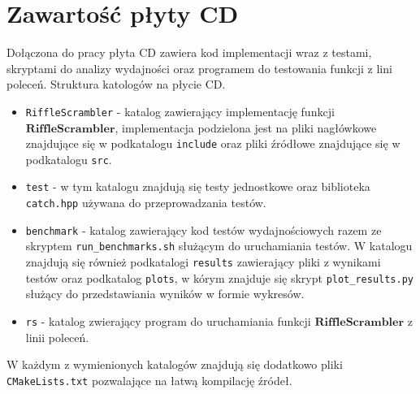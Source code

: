 \chapter{Zawartość płyty CD}
\thispagestyle{chapterBeginStyle}
\label{plytaCD}

Dołączona do pracy płyta CD zawiera kod implementacji wraz z testami, skryptami do analizy wydajności oraz programem do testowania funkcji z lini poleceń.
Struktura katologów na płycie CD.
\begin{itemize}
	\item \texttt{RiffleScrambler} - katalog zawierający implementację funkcji $\mathbf{RiffleScrambler}$, implementacja podzielona jest na pliki nagłówkowe znajdujące się w podkatalogu \texttt{include} oraz pliki źródłowe znajdujące się w podkatalogu \texttt{src}.
	
	\item \texttt{test} - w tym katalogu znajdują się testy jednostkowe oraz biblioteka \texttt{catch.hpp} używana do przeprowadzania testów.
	
	\item \texttt{benchmark} - katalog zawierający kod testów wydajnościowych razem ze skryptem \texttt{run\_benchmarks.sh} służącym do uruchamiania testów. W katalogu znajdują się również podkatalogi \texttt{results} zawierający pliki z wynikami testów oraz podkatalog \texttt{plots}, w kórym znajduje się skrypt \texttt{plot\_results.py} służący do przedstawiania wyników w formie wykresów.
	
	\item \texttt{rs} - katalog zwierający program do uruchamiania funkcji $\mathbf{RiffleScrambler}$ z linii poleceń.
\end{itemize}

W każdym z wymienionych katalogów znajdują się dodatkowo pliki \texttt{CMakeLists.txt} pozwalające na łatwą kompilację źródeł.

